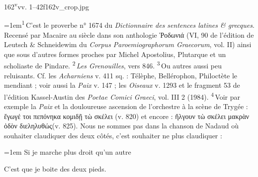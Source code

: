 \documentclass{thesmo}
\begin{document}
\begin{folio}{162\textsuperscript{v}}{vv. 1–42}{f162v_crop.jpg}
\begin{texte}
{\par{\fontsize{7.6}{9.4}\selectfont\leftskip=1em\noindent \textsuperscript{1}\,C'est le proverbe n° 1674 du \textit{Dictionnaire des sentences latines \& grecques}. Recensé par Macaire au  siècle dans son anthologie Ῥοδωνιά (VI, 90 de l'édition de Leutsch \& Schneidewim du \textit{Corpus Paroemiographorum Graecorum}, vol. II) ainsi que sous d'autres formes proches par Michel Apostolius, Plutarque et un scholiaste de Pindare. \textsuperscript{2}\,\textit{Les Grenouilles}, vers 846. \textsuperscript{3}\,Ou autres aussi peu reluisants. Cf. les \textit{Acharniens} v. 411 sq. : Télèphe, Bellérophon, Philoctète le mendiant ; voir aussi la \textit{Paix} v. 147 ; les \textit{Oiseaux} v. 1293 et le fragment 53 de l'édition Kassel-Austin des \textit{Poetae Comici Graeci}, vol. III 2 (1984). \textsuperscript{4}\,Voir par exemple la \textit{Paix} et la douloureuse ascension de l'orchestre à la scène de Trygée : ἔγωγέ τοι πεπόνηκα κομιδῇ τὼ σκέλει (v. 820) et encore : ἤλγουν τὼ σκέλει μακρὰν ὁδὸν διεληλυθώς(v. 825). 
Nous ne sommes pas dans la chanson de Nadaud où souhaiter claudiquer des deux côtés, c'est souhaiter ne plus claudiquer :
\par{\leftskip=1em Si je marche plus droit qu'un autre\par 
C'est que je boite des deux pieds.}\par}}

\end{texte}
\end{folio}
\end{document}

